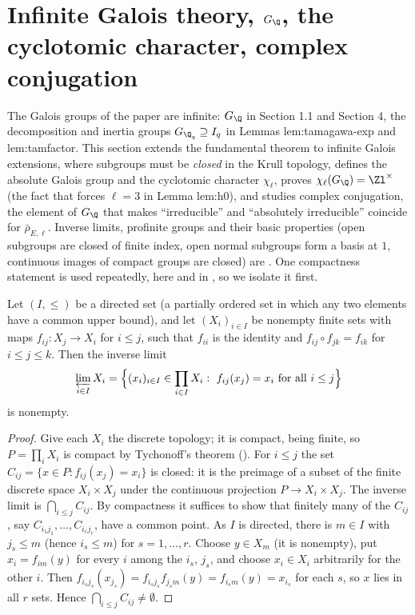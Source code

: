 \section[Infinite Galois theory, \texorpdfstring{$G_\Q$}{GQ}, the cyclotomic character]{Infinite Galois theory, \texorpdfstring{$G_\Q$}{GQ}, the cyclotomic character, complex conjugation}\label{sec:galois:infinite}

The Galois groups of the paper are infinite: $G_\Q$ in Section 1.1 and Section 4, the decomposition and inertia groups $G_{\Q_q}\supseteq I_q$ in Lemmas
lem:tamagawa-exp and lem:tamfactor. This section extends the fundamental theorem to infinite Galois extensions, where subgroups must be \emph{closed} in the Krull
topology, defines the absolute Galois group and the cyclotomic character $\chi_\ell$, proves $\chi_\ell(G_\Q)=\Zl^\times$ (the fact that forces $\ell=3$ in Lemma
lem:h0), and studies complex conjugation, the element of $G_\Q$ that makes ``irreducible'' and ``absolutely irreducible'' coincide for $\bar\rho_{E,\ell}$. Inverse
limits, profinite groups and their basic properties (open subgroups are closed of finite index, open normal subgroups form a basis at $1$, continuous images of
compact groups are closed) are . One compactness statement is used repeatedly, here and in , so we isolate it first.

\begin{lemma}\label{lem:galois:nonempty-limit}
Let $(I,\le)$ be a directed set (a partially ordered set in which any two elements have a common upper bound), and let $(X_i)_{i\in I}$ be nonempty finite sets with maps
$f_{ij}\colon X_j\to X_i$ for $i\le j$, such that $f_{ii}$ is the identity and $f_{ij}\circ f_{jk}=f_{ik}$ for $i\le j\le k$. Then the inverse limit
\[
\varprojlim_{i\in I}X_i=\Bigl\{(x_i)_{i\in I}\in\prod_{i\in I}X_i:\ f_{ij}(x_j)=x_i\text{ for all }i\le j\Bigr\}
\]
is nonempty.
\end{lemma}

\begin{proof}
Give each $X_i$ the discrete topology; it is compact, being finite, so $P=\prod_iX_i$ is compact by Tychonoff's theorem (). For $i\le j$ the set
$C_{ij}=\{x\in P:f_{ij}(x_j)=x_i\}$ is closed: it is the preimage of a subset of the finite discrete space $X_i\times X_j$ under the continuous projection $P\to X_i\times X_j$.
The inverse limit is $\bigcap_{i\le j}C_{ij}$. By compactness it suffices to show that finitely many of the $C_{ij}$, say $C_{i_1j_1},\dots,C_{i_rj_r}$, have a common point.
As $I$ is directed, there is $m\in I$ with $j_s\le m$ (hence $i_s\le m$) for $s=1,\dots,r$. Choose $y\in X_m$ (it is nonempty), put $x_i=f_{im}(y)$ for every $i$ among the
$i_s$, $j_s$, and choose $x_i\in X_i$ arbitrarily for the other $i$. Then $f_{i_sj_s}(x_{j_s})=f_{i_sj_s}f_{j_sm}(y)=f_{i_sm}(y)=x_{i_s}$ for each $s$, so $x$ lies in all $r$
sets. Hence $\bigcap_{i\le j}C_{ij}\ne\emptyset$.
\end{proof}

